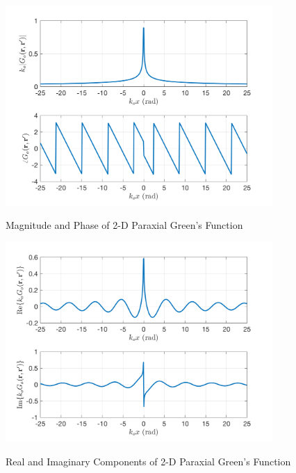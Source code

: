 \begin{figure}[ht]
\begin{center}
\includegraphics[width=4in]{../media/2d_paraxial_gf_mag.png}
\end{center}
\renewcommand{\baselinestretch}{1}
\small\normalsize
\begin{quote}
\caption[Magnitude and Phase of 2-D Paraxial Green's Function]{Magnitude and Phase of 2-D Paraxial Green's Function \label{gf_fig:5}}
\end{quote}
\end{figure} 
\renewcommand{\baselinestretch}{2}
\small\normalsize

\begin{figure}[ht]
\begin{center}
\includegraphics[width=4in]{../media/2d_paraxial_gf_re_im.png}
\end{center}
\renewcommand{\baselinestretch}{1}
\small\normalsize
\begin{quote}
\caption[Real and Imaginary Components of 2-D Paraxial Green's Function]{Real and Imaginary Components of 2-D Paraxial Green's Function \label{gf_fig:6}}
\end{quote}
\end{figure} 
\renewcommand{\baselinestretch}{2}
\small\normalsize

